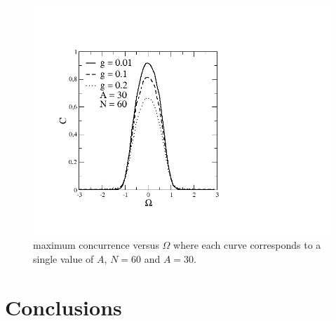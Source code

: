 \documentclass{comjnl}
\begin{document}
\begin{figure}[ht]
  \centering
  \includegraphics[width= \linewidth]{cga30.png}
  \caption{maximum concurrence versus $\Omega$ where each curve corresponds to a single value of $A$, $N = 60$ and $A = 30$.}
\end{figure}


\section{Conclusions} \label{Conclusions}




\end{document}
